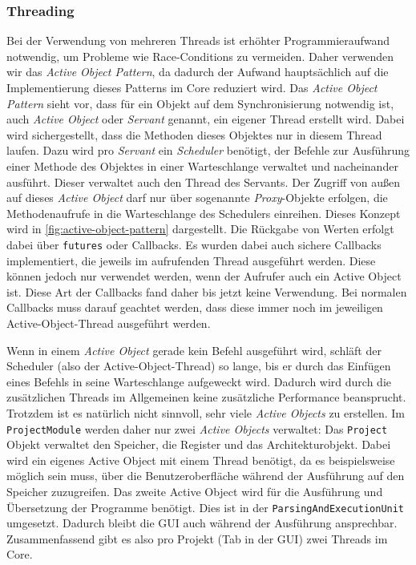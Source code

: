 \subsubsection{Threading}

Bei der Verwendung von mehreren Threads ist erhöhter Programmieraufwand
notwendig, um Probleme wie Race-Conditions zu vermeiden. Daher verwenden wir das
\textit{Active Object Pattern}, da dadurch der Aufwand hauptsächlich auf die
Implementierung dieses Patterns im Core reduziert wird. Das \textit{Active
Object Pattern} sieht vor, dass für ein Objekt auf dem Synchronisierung
notwendig ist, auch \textit{Active Object} oder \textit{Servant} genannt, ein
eigener Thread erstellt wird. Dabei wird sichergestellt, dass die Methoden
dieses Objektes nur in diesem Thread laufen. Dazu wird pro \textit{Servant} ein
\textit{Scheduler} benötigt, der Befehle zur Ausführung einer Methode des
Objektes in einer Warteschlange verwaltet und nacheinander ausführt. Dieser
verwaltet auch den Thread des Servants. Der Zugriff von außen auf dieses
\textit{Active Object} darf nur über sogenannte \textit{Proxy}-Objekte erfolgen,
die Methodenaufrufe in die Warteschlange des Schedulers einreihen. Dieses
Konzept wird in \autoref{fig:active-object-pattern} dargestellt. Die Rückgabe
von Werten erfolgt dabei über \texttt{futures} oder Callbacks. Es wurden dabei
auch sichere Callbacks implementiert, die jeweils im aufrufenden Thread
ausgeführt werden. Diese können jedoch nur verwendet werden, wenn der Aufrufer
auch ein Active Object ist. Diese Art der Callbacks fand daher bis jetzt keine
Verwendung. Bei normalen Callbacks muss darauf geachtet werden, dass diese immer
noch im jeweiligen Active-Object-Thread ausgeführt werden.

Wenn in einem \textit{Active Object} gerade kein Befehl ausgeführt wird, schläft
der Scheduler (also der Active-Object-Thread) so lange, bis er durch das
Einfügen eines Befehls in seine Warteschlange aufgeweckt wird. Dadurch wird
durch die zusätzlichen Threads im Allgemeinen keine zusätzliche Performance
beansprucht. Trotzdem ist es natürlich nicht sinnvoll, sehr viele \textit{Active
Objects} zu erstellen. Im \texttt{ProjectModule} werden daher nur zwei
\textit{Active Objects} verwaltet: Das \texttt{Project} Objekt verwaltet den
Speicher, die Register und das Architekturobjekt. Dabei wird ein eigenes Active
Object mit einem Thread benötigt, da es beispielsweise möglich sein muss, über
die Benutzeroberfläche während der Ausführung auf den Speicher zuzugreifen. Das
zweite Active Object wird für die Ausführung und Übersetzung der Programme
benötigt. Dies ist in der \texttt{ParsingAndExecutionUnit} umgesetzt. Dadurch
bleibt die GUI auch während der Ausführung ansprechbar. Zusammenfassend gibt es
also pro Projekt (Tab in der GUI) zwei Threads im Core.

